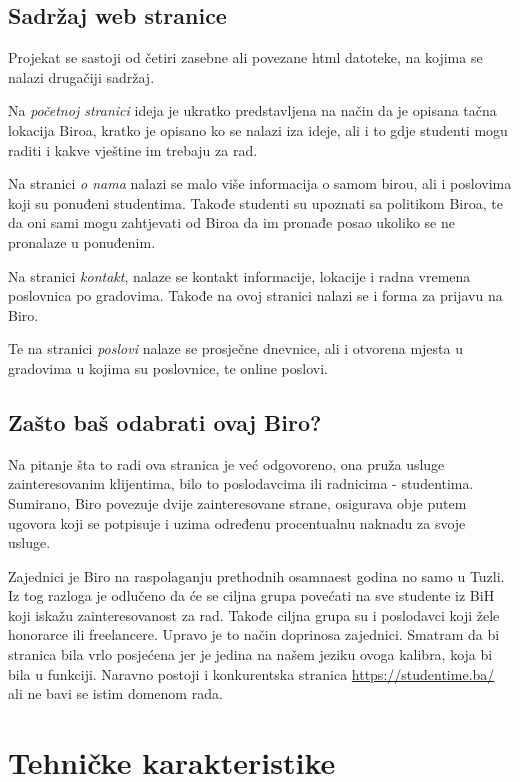 \documentclass[a4paper]{article}
\begin{document}
\subsection{Sadržaj web stranice}
Projekat se sastoji od četiri zasebne ali povezane html datoteke, na kojima se nalazi drugačiji sadržaj.

Na \emph{početnoj stranici} ideja je ukratko predstavljena na način da je opisana tačna lokacija Biroa, kratko je opisano ko se nalazi iza ideje, ali i to gdje studenti mogu raditi i kakve vještine im trebaju za rad. 

Na stranici \emph{o nama} nalazi se malo više informacija o samom birou, ali i poslovima koji su ponuđeni studentima. Takođe studenti su upoznati sa politikom Biroa, te da oni sami mogu zahtjevati od Biroa da im pronađe posao ukoliko se ne pronalaze u ponuđenim.

Na stranici \emph{kontakt}, nalaze se kontakt informacije, lokacije i radna vremena poslovnica po gradovima. Takođe na ovoj stranici nalazi se i forma za prijavu na Biro. 

Te na stranici \emph{poslovi} nalaze se prosječne dnevnice, ali i otvorena mjesta u gradovima u kojima su poslovnice, te online poslovi. 

\subsection{Zašto baš odabrati ovaj Biro?}
Na pitanje šta to radi ova stranica je već odgovoreno, ona pruža usluge zainteresovanim klijentima, bilo to poslodavcima ili radnicima - studentima. Sumirano, Biro povezuje dvije zainteresovane strane, osigurava obje putem ugovora koji se potpisuje i uzima određenu procentualnu naknadu za svoje usluge. 

Zajednici je Biro na raspolaganju prethodnih osamnaest godina no samo u Tuzli. Iz tog razloga je odlučeno da će se ciljna grupa povećati na sve studente iz BiH koji iskažu zainteresovanost za rad. Takođe ciljna grupa su i poslodavci koji žele honorarce ili freelancere. Upravo je to način doprinosa zajednici. Smatram da bi stranica bila vrlo posjećena jer je jedina na našem jeziku ovoga kalibra, koja bi bila u funkciji. Naravno postoji i konkurentska stranica \url{https://studentime.ba/} ali ne bavi se istim domenom rada. 

\section{Tehničke karakteristike}
\end{document}
